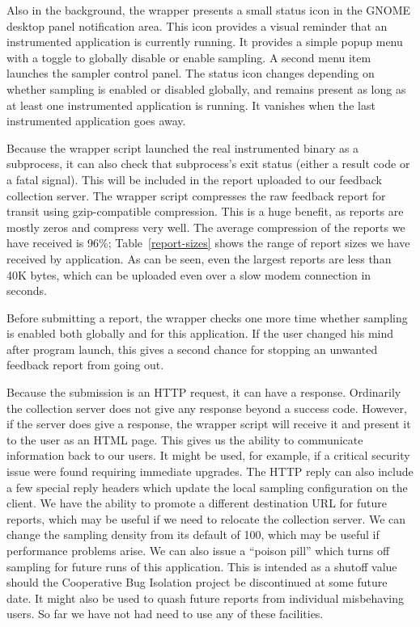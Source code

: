 \documentclass[times,10pt,twocolumn]{article}
\begin{document}
Also in the background, the wrapper presents a small status icon in
the GNOME desktop panel notification area.  This icon provides a
visual reminder that an instrumented application is currently running.
It provides a simple popup menu with a toggle to globally disable or
enable sampling.  A second menu item launches the sampler control
panel.  The status icon changes depending on whether sampling is
enabled or disabled globally, and remains present as long as at least
one instrumented application is running.  It vanishes when the last
instrumented application goes away.

Because the wrapper script launched the real instrumented binary as a
subprocess, it can also check that subprocess's exit status (either a
result code or a fatal signal).  This will be included in the report
uploaded to our feedback collection server.
The wrapper script compresses the raw feedback report for transit
using gzip-compatible compression.  This is a huge benefit, as reports
are mostly zeros and compress very well.  The average compression
of the reports we have received is 96\%; Table~\ref{report-sizes} shows
the range of report sizes we have received by application.  As can be
seen, even the largest reports are less than 40K bytes, which can be uploaded
even over a slow modem connection in seconds.

Before submitting a report, the wrapper checks one more time whether
sampling is enabled both globally and for this application.  If the
user changed his mind after program launch, this gives a second chance
for stopping an unwanted feedback report from going out.

Because the submission is an HTTP request, it can have a response.
Ordinarily the collection server does not give any response beyond a
success code.  However, if the server does give a response, the
wrapper script will receive it and present it to the user as an HTML
page.  This gives us the ability to communicate information back to
our users.  It might be used, for example, if a critical security
issue were found requiring immediate upgrades.  
The HTTP reply can also include a few special reply headers which
update the local sampling configuration on the client.  We have the
ability to promote a different destination URL for future reports,
which may be useful if we need to relocate the collection server.  We
can change the sampling density from its default of 100, which may be
useful if performance problems arise.  We can also issue a ``poison
pill'' which turns off sampling for future runs of this application.
This is intended as a shutoff value should the Cooperative Bug
Isolation project be discontinued at some future date.  It might also
be used to quash future reports from individual misbehaving users.  So
far we have not had need to use any of these facilities.  
\end{document}
